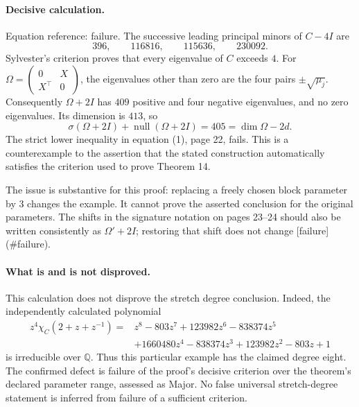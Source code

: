 \documentclass[10pt]{article}
\begin{document}
\paragraph*{Decisive calculation.}\mbox{}\par
Equation reference: failure. The successive leading principal minors of \(C-4I\) are \[396,\qquad116816,\qquad115636,\qquad230092.\] Sylvester’s criterion proves that every eigenvalue of \(C\) exceeds \(4\). For \(\Omega=\left(\begin{smallmatrix}0&X\\X^\top&0\end{smallmatrix}\right)\), the eigenvalues other than zero are the four pairs \(\pm\sqrt{\mu_j}\). Consequently \(\Omega+2I\) has \(409\) positive and four negative eigenvalues, and no zero eigenvalues. Its dimension is \(413\), so \[
 \sigma(\Omega+2I)+\operatorname{null}(\Omega+2I)=405
 =\dim\Omega-2d.\] The strict lower inequality in equation (1), page 22, fails. This is a counterexample to the assertion that the stated construction automatically satisfies the criterion used to prove Theorem 14.\par
The issue is substantive for this proof: replacing a freely chosen block parameter by \(3\) changes the example. It cannot prove the asserted conclusion for the original parameters. The shifts in the signature notation on pages 23–24 should also be written consistently as \(\Omega'+2I\); restoring that shift does not change [failure] (\#failure).\par
\paragraph*{What is and is not disproved.}\mbox{}\par
This calculation does not disprove the stretch degree conclusion. Indeed, the independently calculated polynomial \[\begin{split}
 z^4\chi_C(2+z+z^{-1})={}&z^8-803z^7+123982z^6-838374z^5\\
 &+1660480z^4-838374z^3+123982z^2-803z+1
\end{split}\] is irreducible over \(\mathbb Q\). Thus this particular example has the claimed degree eight. The confirmed defect is failure of the proof’s decisive criterion over the theorem’s declared parameter range, assessed as Major. No false universal stretch-degree statement is inferred from failure of a sufficient criterion.\par
\end{document}

